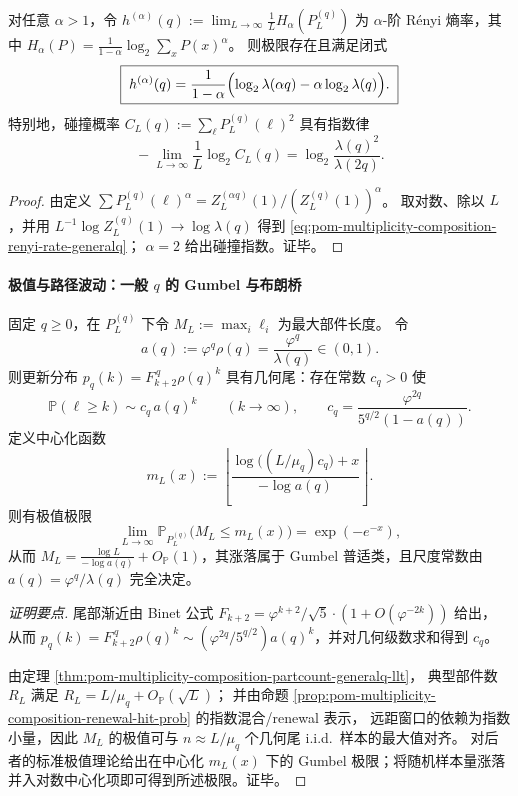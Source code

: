 \begin{proposition}\label{prop:pom-multiplicity-composition-renyi-collision-generalq}
对任意 \(\alpha>1\)，令
\(
h^{(\alpha)}(q):=\lim_{L\to\infty}\frac{1}{L}H_\alpha(P_L^{(q)})
\)
为 \(\alpha\)-阶 Rényi 熵率，其中
\(
H_\alpha(P)=\frac{1}{1-\alpha}\log_2\sum_x P(x)^\alpha
\)。
则极限存在且满足闭式
\begin{equation}\label{eq:pom-multiplicity-composition-renyi-rate-generalq}
\boxed{\;
h^{(\alpha)}(q)=\frac{1}{1-\alpha}\Bigl(\log_2\lambda(\alpha q)-\alpha\log_2\lambda(q)\Bigr).\;}
\end{equation}
特别地，碰撞概率
\(
C_L(q):=\sum_{\boldsymbol{\ell}}P_L^{(q)}(\boldsymbol{\ell})^2
\)
具有指数律
\[
\boxed{\;
-\lim_{L\to\infty}\frac{1}{L}\log_2 C_L(q)=\log_2\frac{\lambda(q)^2}{\lambda(2q)}.\;}
\]
\end{proposition}
\begin{proof}
由定义
\(
\sum P_L^{(q)}(\boldsymbol{\ell})^\alpha
=Z_L^{(\alpha q)}(1)/(Z_L^{(q)}(1))^\alpha
\)。
取对数、除以 \(L\)，并用
\(
L^{-1}\log Z_L^{(q)}(1)\to \log\lambda(q)
\)
得到 \eqref{eq:pom-multiplicity-composition-renyi-rate-generalq}；
\(\alpha=2\) 给出碰撞指数。证毕。
\end{proof}

\paragraph{极值与路径波动：一般 \texorpdfstring{$q$}{q} 的 Gumbel 与布朗桥}
\begin{theorem}\label{thm:pom-multiplicity-composition-maxpart-gumbel-generalq}
固定 \(q\ge 0\)，在 \(P_L^{(q)}\) 下令 \(M_L:=\max_i \ell_i\) 为最大部件长度。
令
\[
a(q):=\varphi^{q}\rho(q)=\frac{\varphi^{q}}{\lambda(q)}\in(0,1).
\]
则更新分布 \(p_q(k)=F_{k+2}^{\,q}\rho(q)^k\) 具有几何尾：存在常数 \(c_q>0\) 使
\[
\mathbb{P}(\ell\ge k)\sim c_q\,a(q)^k\qquad(k\to\infty),
\qquad
c_q=\frac{\varphi^{2q}}{5^{q/2}(1-a(q))}.
\]
定义中心化函数
\[
m_L(x):=\left\lfloor \frac{\log\!\bigl((L/\mu_q)c_q\bigr)+x}{-\log a(q)}\right\rfloor .
\]
则有极值极限
\[
\lim_{L\to\infty}\mathbb{P}_{P_L^{(q)}}\bigl(M_L\le m_L(x)\bigr)=\exp(-e^{-x}),
\]
从而
\(
M_L=\frac{\log L}{-\log a(q)}+O_{\mathbb{P}}(1)
\)，其涨落属于 Gumbel 普适类，且尺度常数由 \(a(q)=\varphi^{q}/\lambda(q)\) 完全决定。
\end{theorem}
\begin{proof}[证明要点]
尾部渐近由 Binet 公式 \(F_{k+2}=\varphi^{k+2}/\sqrt5\cdot(1+O(\varphi^{-2k}))\) 给出，
从而
\(
p_q(k)=F_{k+2}^{\,q}\rho(q)^k\sim (\varphi^{2q}/5^{q/2})a(q)^k
\)，并对几何级数求和得到 \(c_q\)。
\par
由定理 \ref{thm:pom-multiplicity-composition-partcount-generalq-llt}，
典型部件数 \(R_L\) 满足 \(R_L=L/\mu_q+O_{\mathbb{P}}(\sqrt{L})\)；
并由命题 \ref{prop:pom-multiplicity-composition-renewal-hit-prob} 的指数混合/renewal 表示，
远距窗口的依赖为指数小量，因此 \(M_L\) 的极值可与 \(n\approx L/\mu_q\) 个几何尾 i.i.d.\ 样本的最大值对齐。
对后者的标准极值理论给出在中心化 \(m_L(x)\) 下的 Gumbel 极限；将随机样本量涨落并入对数中心化项即可得到所述极限。证毕。
\end{proof}

